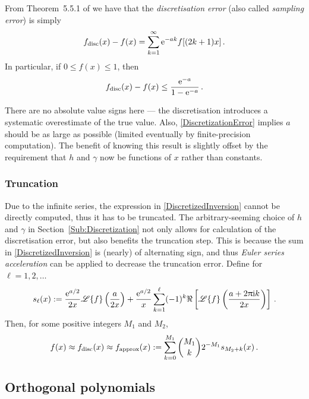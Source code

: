 From Theorem~5.5.1 of \cite{RoScScTe08} we have that the \emph{discretisation error} (also called \emph{sampling error}) is simply
\begin{equation} \label{DiscretizationError}
    f_{\text{disc}}(x) - f(x) = \sum_{k=1}^\infty \mathrm{e}^{-a k} f[ (2k+1) x ] \,.
\end{equation}
In particular, if $0 \le f(x) \le 1$, then
\begin{equation} \label{BoundedDiscretizationError}
    f_{\text{disc}}(x) - f(x) \le \frac{\mathrm{e}^{-a}}{1-\mathrm{e}^{-a}} \,.
\end{equation}

There are no absolute value signs here --- the discretisation introduces a systematic overestimate of the true value.
Also, \eqref{DiscretizationError} implies $a$ should be as large as possible (limited eventually by finite-precision computation).
The benefit of knowing this result is slightly offset by the requirement that $h$ and $\gamma$ now be functions of $x$ rather than constants.

\subsubsection{Truncation}

Due to the infinite series, the expression in \eqref{DiscretizedInversion} cannot be directly computed, thus it has to be truncated.
The arbitrary-seeming choice of $h$ and $\gamma$ in Section~\ref{Sub:Discretization} not only allows for calculation of the discretisation error, but also benefits the truncation step. This is because the sum in \eqref{DiscretizedInversion} is (nearly) of alternating sign, and thus \emph{Euler series acceleration} can be applied to decrease the truncation error. Define for $\ell=1,2,\dots$
\begin{equation*} \label{TruncatedInversion}
s_\ell(x) := \frac{\mathrm{e}^{a/2}}{2x}\mathscr{L}\{f\} \left(\frac{a}{2 x}\right) + \frac{\mathrm{e}^{a/2}}{x} \sum_{k=1}^\ell (-1)^{k} \Re\left[\mathscr{L}\{f\}\left(\frac{a+ 2\uppi \mathrm{i} k}{2 x}\right)\right] \,.
\end{equation*}
Then, for some positive integers $M_1$ and $M_2$,
\begin{equation}\label{eq:FinalApproxLaplaceInversion}
f(x) \approx f_{\text{disc}}(x) \approx f_{\text{approx}}(x) := \sum_{k=0}^{M_1} \binom{M_1}{k} 2^{-M_1} s_{M_2+k}(x) \,.
\end{equation}

\subsection{Orthogonal polynomials} \label{subsc:ortho_poly}

